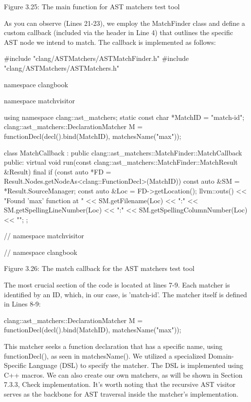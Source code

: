 \begin{center}
Figure 3.25: The main function for AST matchers test tool
\end{center}

As you can observe (Lines 21-23), we employ the MatchFinder class and define a custom callback (included via the header in Line 4) that outlines the specific AST node we intend to match. The callback is implemented as follows:

\begin{cpp}
#include "clang/ASTMatchers/ASTMatchFinder.h"
#include "clang/ASTMatchers/ASTMatchers.h"

namespace clangbook {
namespace matchvisitor {
using namespace clang::ast_matchers;
static const char *MatchID = "match-id";
clang::ast_matchers::DeclarationMatcher M =
  functionDecl(decl().bind(MatchID), matchesName("max"));

class MatchCallback : public clang::ast_matchers::MatchFinder::MatchCallback {
public:
  virtual void
  run(const clang::ast_matchers::MatchFinder::MatchResult &Result) final {
    if (const auto *FD = Result.Nodes.getNodeAs<clang::FunctionDecl>(MatchID)) {
       const auto &SM = *Result.SourceManager;
       const auto &Loc = FD->getLocation();
       llvm::outs() << "Found ’max’ function at " << SM.getFilename(Loc) << ":"
                    << SM.getSpellingLineNumber(Loc) << ":"
                    << SM.getSpellingColumnNumber(Loc) << "\n";
    }
   }
};


} // namespace matchvisitor
} // namespace clangbook
\end{cpp}

\begin{center}
Figure 3.26: The match callback for the AST matchers test tool
\end{center}

The most crucial section of the code is located at lines 7-9. Each matcher is identified by an ID, which, in our case, is ’match-id’. The matcher itself is defined in Lines 8-9:

\begin{cpp}
clang::ast_matchers::DeclarationMatcher M =
  functionDecl(decl().bind(MatchID), matchesName("max"));
\end{cpp}

This matcher seeks a function declaration that has a specific name, using functionDecl(), as seen in matchesName(). We utilized a specialized Domain-Specific Language (DSL) to specify the matcher. The DSL is implemented using C++ macros. We can also create our own matchers, as will be shown in Section 7.3.3, Check implementation. It’s worth noting that the recursive AST visitor serves as the backbone for AST traversal inside the matcher’s implementation.

